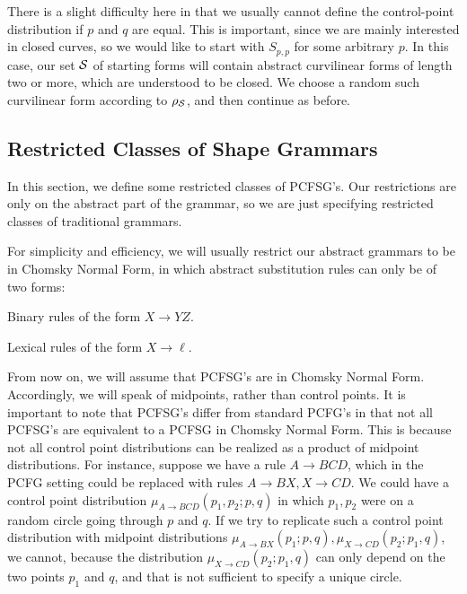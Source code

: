 There is a slight difficulty here in that we usually cannot define the
control-point distribution if $p$ and $q$ are equal. This is
important, since we are mainly interested in closed curves, so we
would like to start with $S_{p,p}$ for some arbitrary $p$. In this
case, our set ${\mathcal S}$ of starting forms will contain abstract
curvilinear forms of length two or more, which are understood to be
closed. We choose a random such curvilinear form according to
$\rho_{\mathcal S}$, and then continue as before.

\subsection{Restricted Classes of Shape Grammars}

In this section, we define some restricted classes of PCFSG's. Our
restrictions are only on the abstract part of the grammar, so we are
just specifying restricted classes of traditional grammars.

For simplicity and efficiency, we will usually restrict our abstract
grammars to be in Chomsky Normal Form, in which abstract substitution
rules can only be of two forms: 
\bitem
\item Binary rules of the form $X \to Y Z$.
\item Lexical rules of the form $X \to \ell$.
\eitem 

From now on, we will assume that PCFSG's are in Chomsky Normal Form.
Accordingly, we will speak of midpoints, rather than control
points. It is important to note that PCFSG's differ from standard
PCFG's in that not all PCFSG's are equivalent to a PCFSG in Chomsky
Normal Form. This is because not all control point distributions can
be realized as a product of midpoint distributions. For instance,
suppose we have a rule $A\to BCD$, which in the PCFG setting could be
replaced with rules $A\to BX, X\to CD$. We could have a control point
distribution $\mu_{A\to BCD}(p_1,p_2;p,q)$ in which $p_1,p_2$ were on
a random circle going through $p$ and $q$. If we try to replicate such
a control point distribution with midpoint distributions $\mu_{A\to
  BX}(p_1; p,q), \mu_{X\to CD}(p_2; p_1, q)$, we cannot, because the
distribution $\mu_{X\to CD}(p_2; p_1,q)$ can only depend on the two
points $p_1$ and $q$, and that is not sufficient to specify a unique
circle.

